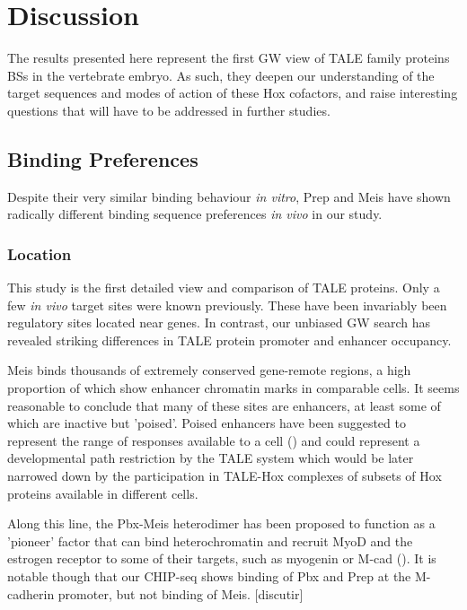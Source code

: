 \chapter{Discussion}
\label{chp:discussion}

The results presented here represent the first \ac{GW} view of \ac{TALE} family proteins \acp{BS} in the vertebrate embryo. As such, they deepen our understanding of the target sequences and modes of action of these Hox cofactors, and raise interesting questions that will have to be addressed in further studies. 

\section{Binding Preferences}

Despite their very similar binding behaviour \textit{in vitro}, Prep and Meis have shown radically different binding sequence preferences \textit{in vivo} in our study. 

\subsection{Location}

This study is the first detailed view and comparison of \ac{TALE} proteins. Only a few \textit{in vivo} target sites were known previously. These have been invariably been regulatory sites located near genes. In contrast, our unbiased \ac{GW} search has revealed striking differences in \ac{TALE} protein promoter and enhancer occupancy. 

Meis binds thousands of extremely conserved gene-remote regions, a high proportion of which show enhancer chromatin marks in comparable cells. It seems reasonable to conclude that many of these sites are enhancers, at least some of which are inactive but 'poised'. Poised enhancers have been suggested to represent the range of responses available to a cell (\cite{Creyghton2010}) and could represent a developmental path restriction by the \ac{TALE} system which would be later narrowed down by the participation in \ac{TALE}-Hox complexes of subsets of Hox proteins available in different cells. 

Along this line, the Pbx-Meis heterodimer has been proposed to function as a 'pioneer' factor that can bind heterochromatin and recruit MyoD and the estrogen receptor to some of their targets, such as myogenin or M-cad (\cite{Berkes2004,Magnani2011}). It is notable though that our \ac{CHIP}-seq shows binding of Pbx and Prep at the M-cadherin promoter, but not binding of Meis. [discutir]

